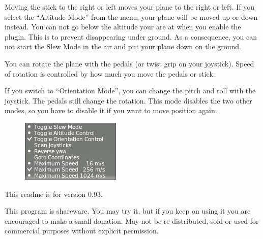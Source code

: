 \documentclass[a4paper,12pt]{article}
\begin{document}
Moving the stick to the right or left moves your plane to the right or
left. If you select the ``Altitude Mode'' from the menu, your plane
will be moved up or down instead. You can not go below the altitude
your are at when you enable the plugin. This is to prevent
disappearing under ground. As a consequence, you can not start the
Slew Mode in the air and put your plane down on the ground.

\vspace{0.5\baselineskip}
You can rotate the plane with the pedals (or twist grip on your
joystick). Speed of rotation is controlled by how much you move the
pedals or stick.

\vspace{0.5\baselineskip}
If you switch to ``Orientation Mode'', you can change the pitch and
roll with the joystick. The pedals still change the rotation. This
mode disables the two other modes, so you have to disable it if you
want to move position again.

\begin{figure}[h!]%
\centering
\includegraphics[scale=1]{sleworientation.png}
\label{fig:infowindow}
\end{figure}

\vspace{0.5\baselineskip}
This readme is for version 0.93. 

\vspace{0.5\baselineskip} {\color{text1}This program is shareware. You may try
  it, but if you keep on using it you are encouraged to make a small
  donation. May not be re-distributed, sold or used for commercial
  purposes without explicit permission.}
\end{document}
